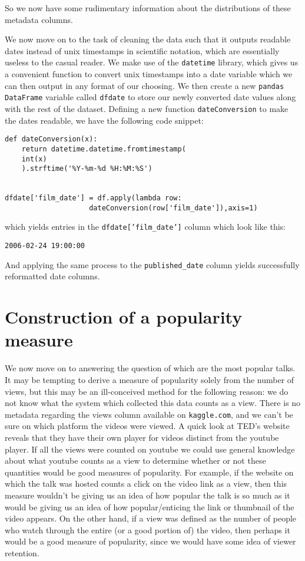\documentclass[11pt,oneside,reqno]{amsart}
\theoremstyle{plain}
\theoremstyle{definition}
\theoremstyle{remark}
\newcommand{\inlinecode}{\texttt}
\begin{document}
So we now have some rudimentary information about the distributions of these metadata columns. 



We now move on to the task of cleaning the data such that it outputs readable dates instead of unix timestamps in scientific notation, which are essentially useless to the casual reader. We make use of the \inlinecode{datetime} library, which gives us a convenient function to convert unix timestamps into a date variable which we can then output in any format of our choosing. We then create a new \inlinecode{pandas} \inlinecode{DataFrame} variable called \inlinecode{dfdate} to store our newly converted date values along with the rest of the dataset. Defining a new function \inlinecode{dateConversion} to make the dates readable, we have the following code snippet:
\begin{framed}
\begin{verbatim}
def dateConversion(x):
    return datetime.datetime.fromtimestamp(
    int(x)
    ).strftime('%Y-%m-%d %H:%M:%S')


dfdate['film_date'] = df.apply(lambda row:
                    dateConversion(row['film_date']),axis=1)
\end{verbatim}
\end{framed}
which yields entries in the \inlinecode{dfdate['film\_date']} column which look like this:
\begin{center}
\inlinecode{2006-02-24 19:00:00}
\end{center}
And applying the same process to the \inlinecode{published\_date} column yields successfully reformatted date columns. 

\section{Construction of a popularity measure}

We now move on to answering the question of which are the most popular talks. It may be tempting to derive a measure of popularity solely from the number of views, but this may be an ill-conceived method for the following reason: we do not know what the system which collected this data counts as a view. There is no metadata regarding the views column available on \inlinecode{kaggle.com}, and we can't be sure on which platform the videos were viewed. A quick look at TED's website reveals that they have their own player for videos distinct from the youtube player. If all the views were counted on youtube we could use general knowledge about what youtube counts as a view to determine whether or not these quantities would be good measures of popularity. For example, if the website on which the talk was hosted counts a click on the video link as a view, then this measure wouldn't be giving us an idea of how popular the talk is so much as it would be giving us an idea of how popular/enticing the link or thumbnail of the video appears. On the other hand, if a view was defined as the number of people who watch through the entire (or a good portion of) the video, then perhaps it would be a good measure of popularity, since we would have some idea of viewer retention. 
\end{document}

